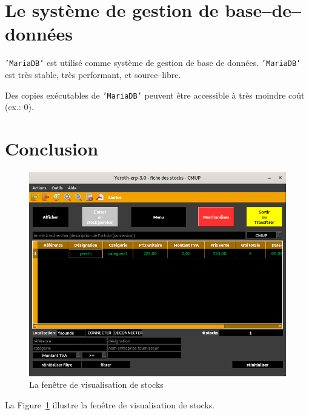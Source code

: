 \documentclass[a4paper, 10pt, twocolumn]{article}
\newcommand{\mariadb}{\texttt{'MariaDB'}\xspace}
\begin{document}
\vspace{-1.1em}
\section{Le syst\`eme de gestion de base--de--donn\'ees}
\vspace{-0.3em}
\mariadb est utilis\'e comme syst\`eme de gestion
de base de donn\'ees. \mariadb est tr\`es stable,
tr\`es performant, et source--libre.

Des copies ex\'ecutables de \mariadb peuvent \^etre
accessible \`a tr\`es moindre co\^ut (ex.: $0$).

\vspace{-1.1em}
\section{Conclusion}
\vspace{-0.7em}
\begin{figure}[!htbp]
\centering
\includegraphics[scale=0.33]{images/yeroth-erp-3-0-fiche-stocks.png}
\caption{La fen\^etre de visualisation de stocks}
\label{fig:fenetre-de-visualisation-de-stocks}
\end{figure}

La Figure~\ref{fig:fenetre-de-visualisation-de-stocks} illustre la
fen\^etre de visualisation de stocks.

\vspace{-0.5em}
\end{document}
